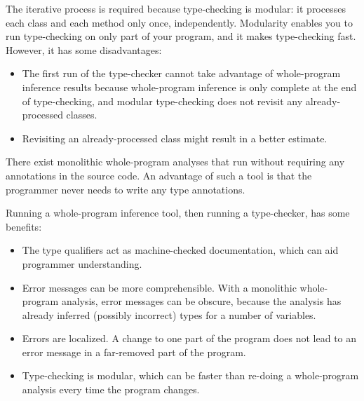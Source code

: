The iterative process is required because type-checking is modular:  it
processes each class and each method only once, independently.  Modularity
enables you to run type-checking on only part of your program, and it makes
type-checking fast.  However, it has some disadvantages:
\begin{itemize}
\item
  The first run of the type-checker cannot take advantage of whole-program
  inference results because whole-program inference is only complete at the
  end of type-checking, and modular type-checking does not revisit any
  already-processed classes.
\item
  Revisiting an
  already-processed class might result in a better estimate.
\end{itemize}



There exist monolithic whole-program analyses that run without requiring any
annotations in the source code.  An advantage of such a tool is that the
programmer never needs to write any type annotations.

Running a whole-program inference tool, then running a type-checker, has
some benefits:
\begin{itemize}
\item
  The type qualifiers act as machine-checked documentation,
  which can aid programmer understanding.
\item
  Error messages can be more comprehensible.  With a monolithic
  whole-program analysis, error messages can be obscure, because the
  analysis has already inferred (possibly incorrect) types for a number of
  variables.
\item
  Errors are localized.  A change to one part of the program does not lead
  to an error message in a far-removed part of the program.
\item
  Type-checking is modular, which can be faster than re-doing a
  whole-program analysis every time the program changes.
\end{itemize}



